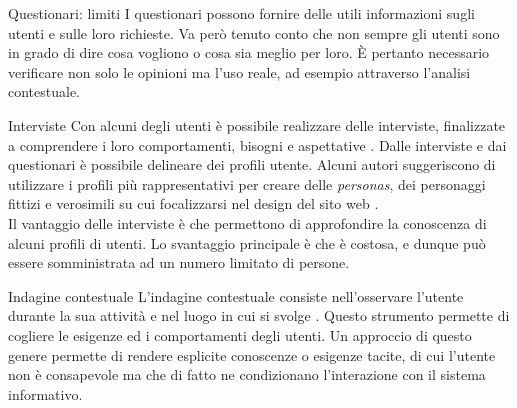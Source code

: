 \documentclass[pdf,mpa]{prosper}
\begin{document}
\begin{slide}{Questionari: limiti}
I questionari possono fornire delle utili informazioni sugli utenti e sulle loro richieste. Va però tenuto conto che non sempre gli utenti sono in grado di dire cosa vogliono o cosa sia meglio per loro. È pertanto necessario verificare non solo le opinioni ma l'uso reale, ad esempio attraverso l'analisi contestuale.
\end{slide}

\begin{slide}{Interviste}
Con alcuni degli utenti è possibile realizzare delle interviste, finalizzate a comprendere i loro comportamenti, bisogni e aspettative \citep{CaprioGhiglione2003}. Dalle interviste e dai questionari è possibile delineare dei profili utente. Alcuni autori suggeriscono di utilizzare i profili più rappresentativi per creare delle \textit{personas}, dei personaggi fittizi e verosimili su cui focalizzarsi nel design del sito web \citep{Sinha2003persona}.\\
Il vantaggio delle interviste è che permettono di approfondire la conoscenza di alcuni profili di utenti. Lo svantaggio principale è che è costosa, e dunque può essere somministrata ad un numero limitato di persone.
\end{slide}

\begin{slide}{Indagine contestuale}
L'indagine contestuale consiste nell'osservare l'utente durante la sua attività e nel luogo in cui si svolge \citep{CaprioGhiglione2003}.
Questo strumento permette di cogliere le esigenze ed i comportamenti degli utenti. Un approccio di questo genere permette di rendere esplicite conoscenze o esigenze tacite, di cui l'utente non è consapevole ma che di fatto ne condizionano l'interazione con il sistema informativo.
\end{slide}
\end{document}
